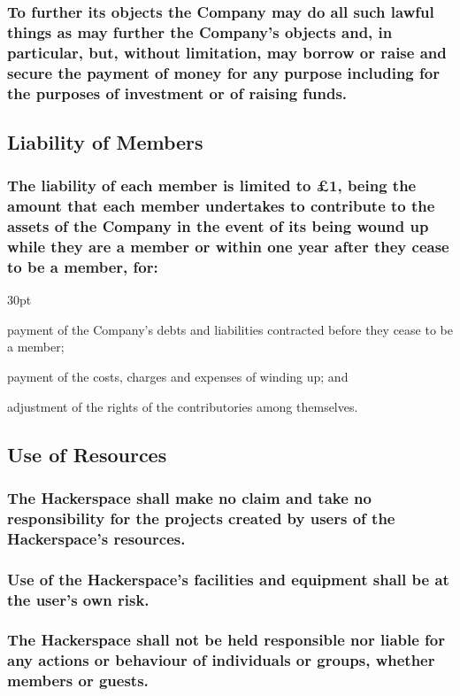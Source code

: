 \documentclass[12pt]{article}
\def\clauseindent{30pt}
\newenvironment{subindent}{\begin{adjustwidth}{\clauseindent}{}\begin{hanginglist}}{\end{hanginglist}\end{adjustwidth}}
\begin{document}
\subsubsection{To further its objects the Company may do all such lawful things as may further the Company’s objects and, in particular, but, without limitation, may borrow or raise and secure the payment of money for any purpose including for the purposes of investment or of raising funds.}

\subsection{Liability of Members}
\subsubsection{The liability of each member is limited to £1, being the amount that each member undertakes to contribute to the assets of the Company in the event of its being wound up while they are a member or within one year after they cease to be a member, for:}
\begin{subindent}
  \item payment of the Company’s debts and liabilities contracted before they cease to be a member;
  \item payment of the costs, charges and expenses of winding up; and
  \item adjustment of the rights of the contributories among themselves.
\end{subindent}

\subsection{Use of Resources}
\subsubsection{The Hackerspace shall make no claim and take no responsibility for the projects created by users of the Hackerspace's resources.}
\subsubsection{Use of the Hackerspace's facilities and equipment shall be at the user's own risk.}
\subsubsection{The Hackerspace shall not be held responsible nor liable for any actions or behaviour of individuals or groups, whether members or guests.}
\end{document}
